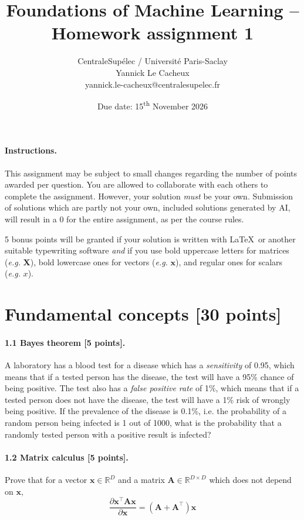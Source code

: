 \documentclass{article}
\title{Foundations of Machine Learning -- Homework assignment 1}
\author{CentraleSupélec / Université Paris-Saclay 
\\ Yannick Le Cacheux
\\ yannick.le-cacheux@centralesupelec.fr}
\date{Due date: 15\textsuperscript{th} November 2026}
\begin{document}
\maketitle

\paragraph{Instructions.}

This assignment may be subject to small changes regarding the number of points awarded per question.
You are allowed to collaborate with each others to complete the assignment.
However, your solution \emph{must} be your own.
Submission of solutions which are partly not your own, included solutions generated by AI, will result in a 0 for the entire assignment, as per the course rules.

5 bonus points will be granted if your solution is written with \LaTeX~or another suitable typewriting software \emph{and} if you use bold uppercase letters for matrices (\textit{e.g.} $\mathbf{X}$), bold lowercase ones for vectors (\textit{e.g.} $\mathbf{x}$), and regular ones for scalars (\textit{e.g.} $x$).


\section{Fundamental concepts [30 points]}

\paragraph{1.1 Bayes theorem [5 points].} A laboratory has a blood test for a disease which has a \textit{sensitivity} of 0.95, which means that if a tested person has the disease, the test will have a 95\% chance of being positive.
The test also has a \textit{false positive rate} of 1\%, which means that if a tested person does not have the disease, the test will have a 1\% risk of wrongly being positive. If the prevalence of the disease is 0.1\%, i.e. the probability of a random person being infected is 1 out of 1000, what is the probability that a randomly tested person with a positive result is infected?

\paragraph{1.2 Matrix calculus [5 points].} Prove that for a vector $\mathbf{x} \in \mathbb{R}^D$ and a matrix $\mathbf{A} \in \mathbb{R}^{D \times D}$ which does not depend on $\mathbf{x}$,
$$\frac{\partial \mathbf{x}^\top \mathbf{A} \mathbf{x}}{\partial \mathbf{x}} = (\mathbf{A} + \mathbf{A}^\top) \mathbf{x}$$
\end{document}
